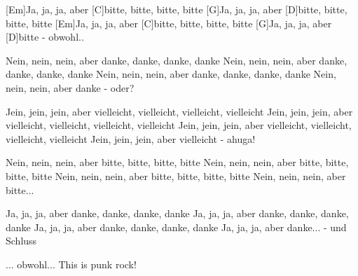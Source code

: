 

\begin{guitar}
	
	[Em]Ja, ja, ja, aber [C]bitte, bitte, bitte, bitte
	[G]Ja, ja, ja, aber [D]bitte, bitte, bitte, bitte
	[Em]Ja, ja, ja, aber [C]bitte, bitte, bitte, bitte
	[G]Ja, ja, ja, aber [D]bitte - obwohl..
	
	Nein, nein, nein, aber danke, danke, danke, danke
	Nein, nein, nein, aber danke, danke, danke, danke
	Nein, nein, nein, aber danke, danke, danke, danke
	Nein, nein, nein, aber danke - oder?
	
	Jein, jein, jein, aber vielleicht, vielleicht, vielleicht, vielleicht
	Jein, jein, jein, aber vielleicht, vielleicht, vielleicht, vielleicht
	Jein, jein, jein, aber vielleicht, vielleicht, vielleicht, vielleicht
	Jein, jein, jein, aber vielleicht - ahuga!
	
	
	Nein, nein, nein, aber bitte, bitte, bitte, bitte
	Nein, nein, nein, aber bitte, bitte, bitte, bitte
	Nein, nein, nein, aber bitte, bitte, bitte, bitte
	Nein, nein, nein, aber bitte...
	
	Ja, ja, ja, aber danke, danke, danke, danke
	Ja, ja, ja, aber danke, danke, danke, danke
	Ja, ja, ja, aber danke, danke, danke, danke
	Ja, ja, ja, aber danke... - und Schluss
	
	... obwohl...
	This is punk rock!
	
\end{guitar}